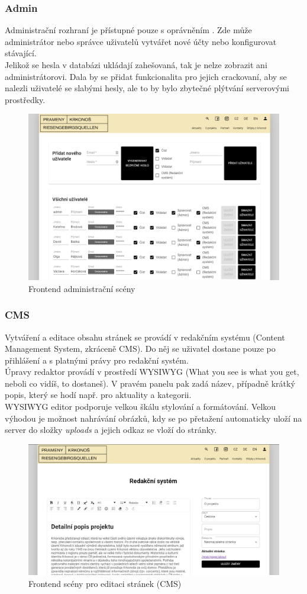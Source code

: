 \subsubsection{Admin}
Administrační rozhraní je přístupné pouze s oprávněním .
Zde může administrátor nebo správce uživatelů vytvářet nové účty nebo
konfigurovat stávající.\\
Jelikož se hesla v databázi ukládají zahešovaná, tak je nelze zobrazit ani administrátorovi.
Dala by se přidat funkcionalita pro jejich crackovaní, aby se nalezli uživatelé se
slabými hesly, ale to by bylo zbytečné plýtvání serverovými prostředky.
\begin{figure}[H]
	\centering
	\includegraphics[width=.8\linewidth]{img/adminScene.png}
	\caption{Frontend administrační scény}
\end{figure}

\subsubsection{CMS}
Vytváření a editace obsahu stránek se provádí v redakčním systému (Content Management System, zkráceně CMS).
Do něj se uživatel dostane pouze po přihlášení a s platnými právy pro redakční systém.\\
Úpravy redaktor provádí v prostředí WYSIWYG (What you see is what you get, neboli co vidíš, to dostaneš).
V pravém panelu pak zadá název, případně krátký popis, který se hodí např. pro aktuality a kategorii.\\
WYSIWYG editor podporuje velkou škálu stylování a formátování. Velkou výhodou je možnost nahrávání obrázků,
kdy se po přetažení automaticky uloží na server do složky \textit{uploads} a jejich odkaz se vloží do stránky.
\begin{figure}[H]
	\centering
	\includegraphics[width=.8\linewidth]{img/cmsScene.png}
	\caption{Frontend scény pro editaci stránek (CMS)}
\end{figure}


